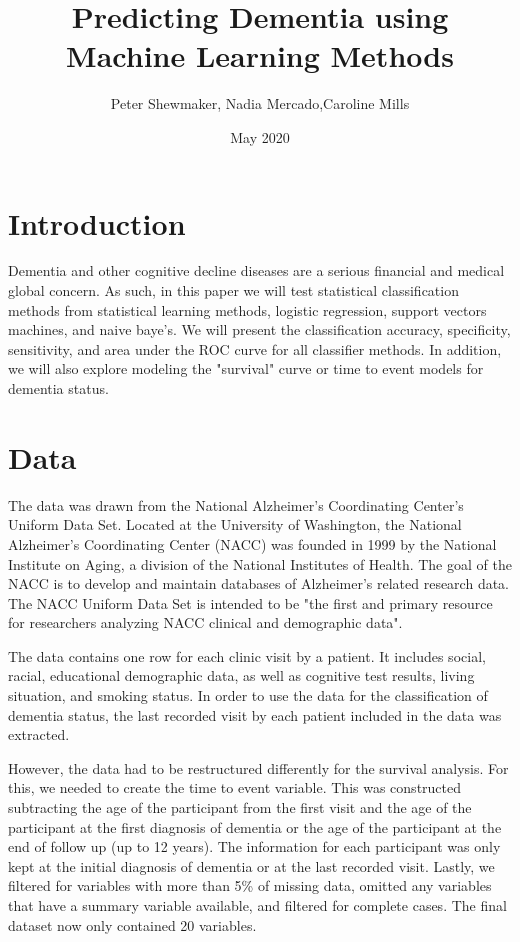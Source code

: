 \documentclass[a4paper,man,natbib,11pt]{article}
\title{Predicting Dementia using Machine Learning Methods}
\author{Peter Shewmaker, Nadia Mercado,Caroline Mills  }
\date{May 2020}
\begin{document}
\maketitle

\section{Introduction}

Dementia and other cognitive decline diseases are a serious financial and medical global concern. As such, in this paper we will test statistical classification methods from statistical learning methods, logistic regression, support vectors machines, and naive baye's. We will present the classification accuracy, specificity, sensitivity, and area under the ROC curve for all classifier methods. In addition, we will also explore modeling the "survival" curve or time to event models for dementia status. 

\section{Data}

The data was drawn from the National Alzheimer's Coordinating Center's Uniform Data Set. Located at the University of Washington, the National Alzheimer's Coordinating Center (NACC) was founded in 1999 by the National Institute on Aging, a division of the National Institutes of Health. The goal of the NACC is to develop and maintain databases of Alzheimer's related research data. The NACC Uniform Data Set is intended to be "the first and primary resource for researchers analyzing NACC clinical and demographic data".

The data contains one row for each clinic visit by a patient. It includes social, racial, educational demographic data, as well as cognitive test results, living situation, and smoking status. In order to use the data for the classification of dementia status, the last recorded visit by each patient included in the data was extracted.

However, the data had to be restructured differently for the survival analysis. For this, we needed to create the time to event variable. This was constructed subtracting the age of the participant from the first visit and the age of the participant at the first diagnosis of dementia or the age of the participant at the end of follow up (up to 12 years). The information for each participant was only kept at the initial diagnosis of dementia or at the last recorded visit. Lastly, we filtered for variables with more than 5\% of missing data, omitted any variables that have a summary variable available, and filtered for complete cases. The final dataset now only contained 20 variables.
\end{document}

